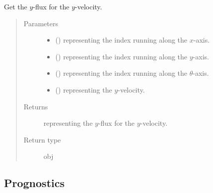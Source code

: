 \documentclass[letterpaper,10pt,english]{sphinxmanual}
\begin{document}
\begin{fulllineitems}
\begin{fulllineitems}
\label{\detokenize{api:dycore.flux_isentropic_nonconservative_centered.FluxIsentropicNonconservativeCentered._get_centered_flux_y_v}}
Get the \(y\)-flux for the \(y\)-velocity.
\begin{quote}\begin{description}
\item[{Parameters}] \leavevmode\begin{itemize}
\item {} 
 () \textendash{}  representing the index running along the \(x\)-axis.

\item {} 
 () \textendash{}  representing the index running along the \(y\)-axis.

\item {} 
 () \textendash{}  representing the index running along the \(\theta\)-axis.

\item {} 
 () \textendash{}  representing the \(y\)-velocity.

\end{itemize}

\item[{Returns}] \leavevmode
{} representing the \(y\)-flux for the \(y\)-velocity.

\item[{Return type}] \leavevmode
obj

\end{description}\end{quote}

\end{fulllineitems}


\end{fulllineitems}



\subsection{Prognostics}
\label{\detokenize{api:prognostics}}
\end{document}
